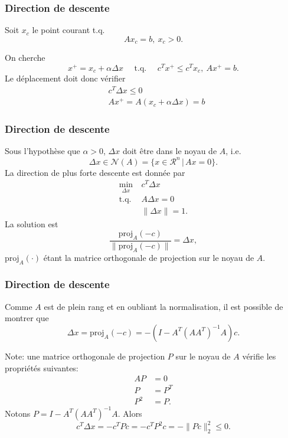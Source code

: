 \documentclass[t,usepdftitle=false]{beamer}
\def\cN{\mathcal{N}}
\def\RR {\mathcal{R}}
\begin{document}
\begin{frame}
	\frametitle{Direction de descente}
	
	Soit $x_c$ le point courant t.q.
	$$
	Ax_c = b, \ x_c > 0.
	$$

	On cherche
	$$
	x^+ = x_c + \alpha \Delta x \quad \text{ t.q. }\quad 
	c^Tx^+ \leq c^T x_c,\ Ax^+ = b.
	$$
	Le déplacement doit donc vérifier
	\begin{align*}
		& c^T \Delta x \leq 0 \\
		& Ax^+ = A(x_c + \alpha \Delta x) = b
	\end{align*}
	
\end{frame}

\begin{frame}
	\frametitle{Direction de descente}
	
	Sous l'hypothèse que $\alpha > 0$, $\Delta x$ doit être dans le noyau de $A$, i.e.
	$$
	\Delta x \in \cN(A) = \{x \in \RR^n \,|\, Ax = 0 \}.
	$$
	La direction de plus forte descente est donnée par
	\begin{align*}
		\min_{\Delta x}\ & c^T\Delta x \\
		\mbox{t.q. } & A \Delta x = 0 \\
		& \| \Delta x \| = 1.
	\end{align*}
	La solution est
	$$
	\frac{\text{proj}_A(-c)}{\| \text{proj}_A (-c) \|} = \Delta x,
	$$
	$\text{proj}_A(\cdot)$ étant la matrice orthogonale de projection sur le
	noyau de $A$.
	
\end{frame}

\begin{frame}
	\frametitle{Direction de descente}
	
	Comme $A$ est de plein rang et en oubliant la normalisation, il est possible de montrer que
	$$
	\Delta x = \text{proj}_A(-c) = -(I - A^T(AA^T)^{-1}A)c.
	$$
	
	\mbox{}
	
	Note: une matrice orthogonale de projection $P$ sur le noyau de $A$ vérifie les propriétés suivantes:
	\begin{align*}
		AP &= 0 \\
		P &= P^T \\
		P^2 &= P.
	\end{align*}
	Notons $P = I - A^T(AA^T)^{-1}A$. Alors
$$
		c^T \Delta x = -c^T P c = -c^T P^2 c = - \| Pc \|^2_2 \leq 0.
$$
	
\end{frame}
\end{document}

